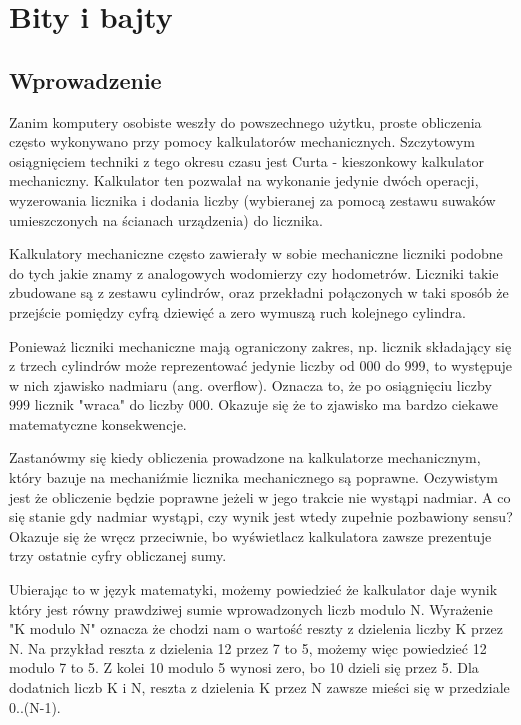 \setchapterpreamble[u]{\margintoc}
\chapter{Bity i bajty}

\section{Wprowadzenie}

Zanim komputery osobiste weszły do powszechnego użytku,
proste obliczenia często wykonywano przy pomocy kalkulatorów
mechanicznych. Szczytowym osiągnięciem techniki z tego okresu
czasu jest Curta - kieszonkowy kalkulator mechaniczny.
Kalkulator ten pozwalał na wykonanie jedynie dwóch operacji,
wyzerowania licznika i dodania liczby (wybieranej za pomocą
zestawu suwaków umieszczonych na ścianach urządzenia) do licznika.



Kalkulatory mechaniczne często zawierały w sobie mechaniczne
liczniki podobne do tych jakie znamy z analogowych wodomierzy czy hodometrów.
Liczniki takie zbudowane są z zestawu cylindrów, oraz przekładni
połączonych w taki sposób że przejście pomiędzy cyfrą dziewięć a zero
wymuszą ruch kolejnego cylindra.

Ponieważ liczniki mechaniczne mają ograniczony zakres, np. licznik
składający się z trzech cylindrów może reprezentować jedynie liczby od 000 do 999,
to występuje w nich zjawisko nadmiaru (ang. overflow).
Oznacza to, że po osiągnięciu liczby 999 licznik "wraca" do liczby 000.
Okazuje się że to zjawisko ma bardzo ciekawe matematyczne konsekwencje.


Zastanówmy się kiedy obliczenia prowadzone na kalkulatorze mechanicznym,
który bazuje na mechaniźmie licznika mechanicznego są poprawne.
Oczywistym jest że obliczenie będzie poprawne jeżeli w jego trakcie
nie wystąpi nadmiar. A co się stanie gdy nadmiar wystąpi, czy wynik
jest wtedy zupełnie pozbawiony sensu? Okazuje się że wręcz przeciwnie,
bo wyświetlacz kalkulatora zawsze prezentuje trzy ostatnie cyfry obliczanej sumy.

Ubierając to w język matematyki, możemy powiedzieć że kalkulator daje
wynik który jest równy prawdziwej sumie wprowadzonych liczb modulo N.
Wyrażenie "K modulo N" oznacza że chodzi nam o wartość reszty z dzielenia
liczby K przez N. Na przykład reszta z dzielenia 12 przez 7 to 5, możemy
więc powiedzieć 12 modulo 7 to 5. Z kolei 10 modulo 5 wynosi zero, bo
10 dzieli się przez 5. Dla dodatnich liczb K i N, reszta z dzielenia K przez N
zawsze mieści się w przedziale 0..(N-1).

